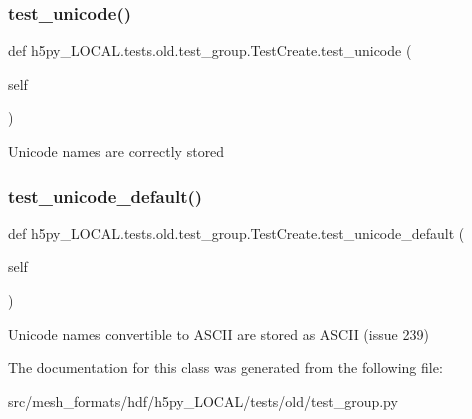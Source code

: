 \subsubsection{\texorpdfstring{test\+\_\+unicode()}{test\_unicode()}}
{\footnotesize\ttfamily def h5py\+\_\+\+L\+O\+C\+A\+L.\+tests.\+old.\+test\+\_\+group.\+Test\+Create.\+test\+\_\+unicode (\begin{DoxyParamCaption}\item[{}]{self }\end{DoxyParamCaption})}

\begin{DoxyVerb}Unicode names are correctly stored \end{DoxyVerb}
 \mbox{\label{classh5py__LOCAL_1_1tests_1_1old_1_1test__group_1_1TestCreate_a0c13621dab8fc5edbfb04f450a011d71}} 
\subsubsection{\texorpdfstring{test\+\_\+unicode\+\_\+default()}{test\_unicode\_default()}}
{\footnotesize\ttfamily def h5py\+\_\+\+L\+O\+C\+A\+L.\+tests.\+old.\+test\+\_\+group.\+Test\+Create.\+test\+\_\+unicode\+\_\+default (\begin{DoxyParamCaption}\item[{}]{self }\end{DoxyParamCaption})}

\begin{DoxyVerb}Unicode names convertible to ASCII are stored as ASCII (issue 239)
\end{DoxyVerb}
 

The documentation for this class was generated from the following file\+:\begin{DoxyCompactItemize}
\item 
src/mesh\+\_\+formats/hdf/h5py\+\_\+\+L\+O\+C\+A\+L/tests/old/test\+\_\+group.\+py\end{DoxyCompactItemize}
